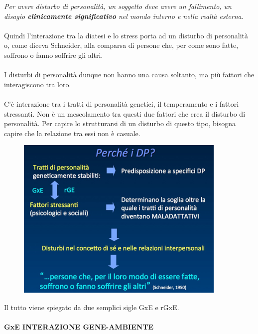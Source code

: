 \emph{Per avere disturbo di personalità, un soggetto deve avere un
fallimento, un disagio \textbf{clinicamente significativo} nel mondo
interno e nella realtà esterna. }
\\\\
Quindi l'interazione tra la diatesi e lo stress porta ad un disturbo di
personalità o, come diceva Schneider, alla comparsa di persone che, per
come sono fatte, soffrono o fanno soffrire gli altri.
\\\\
I disturbi di personalità dunque non hanno una causa soltanto, ma più
fattori che interagiscono tra loro.
\\\\
C'è interazione tra i tratti di personalità genetici, il temperamento e
i fattori stressanti. Non è un mescolamento tra questi due fattori che
crea il disturbo di personalità. Per capire lo strutturarsi di un
disturbo di questo tipo, bisogna capire che la relazione tra essi non è
casuale.

\begin{figure}[!ht]
\centering
	\includegraphics[width=0.9\textwidth]{011/image4.png}
\end{figure}

Il tutto viene spiegato da due semplici sigle GxE e rGxE.

\paragraph{GxE INTERAZIONE GENE-AMBIENTE}

